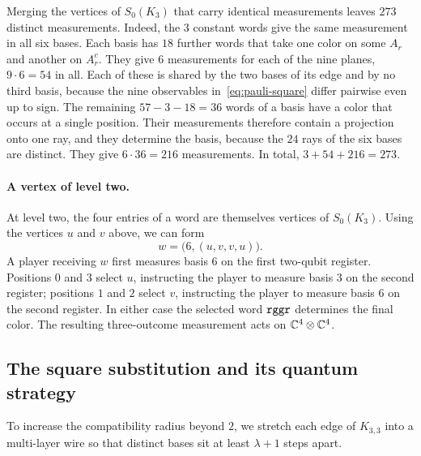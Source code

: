 Merging the vertices of $S_0(K_3)$ that carry identical measurements leaves $273$ distinct measurements. Indeed, the $3$ constant words give the same measurement in all six bases. Each basis has $18$ further words that take one color on some $A_r$ and another on $A_r^c$. They give $6$ measurements for each of the nine planes, $9\cdot6=54$ in all. Each of these is shared by the two bases of its edge and by no third basis, because the nine observables in~\eqref{eq:pauli-square} differ pairwise even up to sign. The remaining $57-3-18=36$ words of a basis have a color that occurs at a single position. Their measurements therefore contain a projection onto one ray, and they determine the basis, because the $24$ rays of the six bases are distinct. They give $6\cdot36=216$ measurements. In total, $3+54+216=273$.

\paragraph{A vertex of level two.}
At level two, the four entries of a word are themselves vertices of $S_0(K_3)$. Using the vertices $u$ and $v$ above, we can form
\[
 w=\bigl(6,(u,v,v,u)\bigr).
\]
A player receiving $w$ first measures basis $6$ on the first two-qubit register. Positions $0$ and $3$ select $u$, instructing the player to measure basis $3$ on the second register; positions $1$ and $2$ select $v$, instructing the player to measure basis $6$ on the second register. In either case the selected word $\mathtt{rggr}$ determines the final color. The resulting three-outcome measurement acts on $\mathbb C^4\otimes\mathbb C^4$.

\subsection{The square substitution and its quantum strategy}\label{sec:substitution}

To increase the compatibility radius beyond $2$, we stretch each edge of $K_{3,3}$ into a multi-layer wire so that distinct bases sit at least $\lambda+1$ steps apart.

